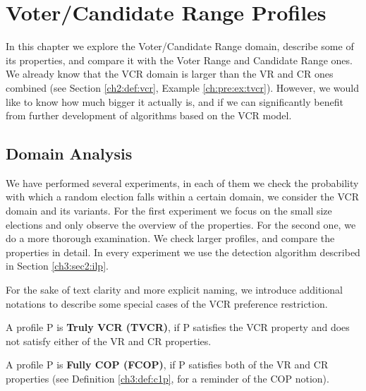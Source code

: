 \chapter{Voter/Candidate Range Profiles}\label{ch:domain}

\ifpdf
    \graphicspath{{Chapter4/Figs/Raster/}{Chapter4/Figs/PDF/}{Chapter4/Figs/}}
\else
    \graphicspath{{Chapter4/Figs/Vector/}{Chapter4/Figs/}}
\fi

In this chapter we explore the Voter/Candidate Range domain, describe some of its properties,
and compare it with the Voter Range and Candidate Range ones.
We already know that the VCR domain is larger than the VR and CR ones combined (see Section \ref{ch2:def:vcr}, Example \ref{ch:pre:ex:tvcr}).
However, we would like to know how much bigger it actually is,
and if we can significantly benefit from further development of algorithms based on the VCR model. 

\section{Domain Analysis}

We have performed several experiments, in each of them we 
check the probability with which a random election falls within a certain domain,
we consider the VCR domain and its variants.
For the first experiment we focus on the small size elections and only observe the overview of the properties.
For the second one, we do a more thorough examination. We check larger profiles, and compare the properties in detail.
In every experiment we use the detection algorithm described in Section \ref{ch3:sec2:ilp}.

For the sake of text clarity and more explicit naming,
we introduce additional notations to describe some special cases of the VCR preference restriction.
\begin{definition}
    A profile P is \textbf{Truly VCR (TVCR)},
    if P satisfies the VCR property and does not satisfy either of the VR and CR properties.
\end{definition}

\begin{definition}
    A profile P is \textbf{Fully COP (FCOP)},
    if P satisfies both of the VR and CR properties
    (see Definition \ref{ch3:def:c1p}, for a reminder of the COP notion).
\end{definition}


